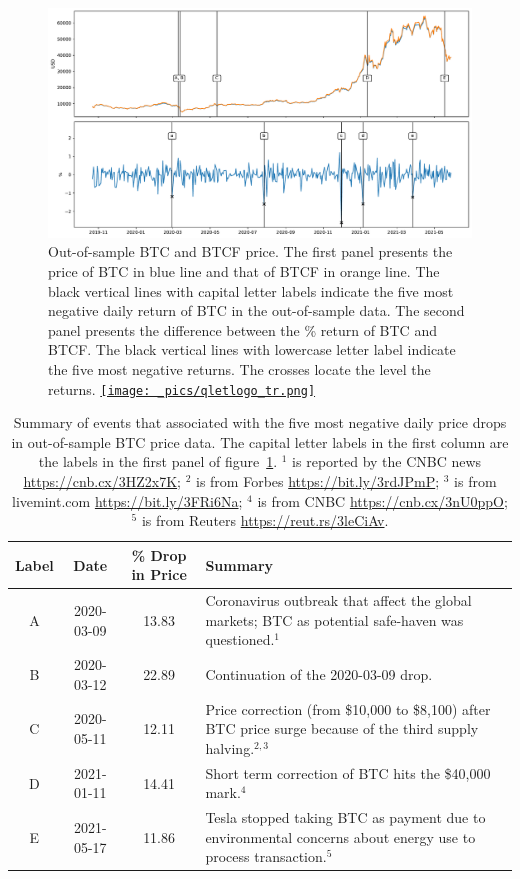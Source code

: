 \begin{figure}[!ht]
\includegraphics[width=\textwidth]{_pics/BTC_price.pdf}
  \caption{Out-of-sample BTC and BTCF price. The first panel presents the price of BTC in blue line and that of BTCF in orange line.
  The black vertical lines with capital letter labels indicate the five most negative daily return of BTC in the out-of-sample data.
  The second panel presents the difference between the \% return of BTC and BTCF.
  The black vertical lines with lowercase letter label indicate the five most negative returns.
  The crosses locate the level the returns.
  \href{http://www.quantlet.com/}{\texttt{[image: \_pics/qletlogo\_tr.png]}} }
\label{fig:BTC_price}
\end{figure}

\begin{table}[ht]
    \centering
      \begin{tabularx}{.8\textwidth}{cccX}
        \toprule
        Label &   Date & \% Drop in Price &  Summary\\
        \midrule
        A &  2020-03-09 & 13.83 &  Coronavirus outbreak that affect the global markets; BTC as potential safe-haven was questioned.$^1$\\
        B &  2020-03-12 & 22.89 &  Continuation of the 2020-03-09 drop.  \\
        C &  2020-05-11 & 12.11 &  Price correction (from \$10,000 to \$8,100) after BTC price surge because of the third supply halving.$^{2,3}$ \\
        D &  2021-01-11 & 14.41 &  Short term correction of BTC hits the \$40,000 mark.$^4$\\
        E &  2021-05-17 & 11.86 &  Tesla stopped taking BTC as payment due to environmental concerns about energy use to process transaction.$^5$\\
        \bottomrule
      \end{tabularx}
        \caption{Summary of events that associated with the five most negative daily price drops in out-of-sample BTC price data.
        The capital letter labels in the first column are the labels in the first panel of figure~\ref{fig:BTC_price}.
        $^1$ is reported by the CNBC news \url{https://cnb.cx/3HZ2x7K}; $^2$ is from Forbes \url{https://bit.ly/3rdJPmP};
        $^3$ is from livemint.com \url{https://bit.ly/3FRi6Na};
        $^4$ is from CNBC \url{https://cnb.cx/3nU0ppO};
        $^5$ is from Reuters \url{https://reut.rs/3leCiAv}.
        }
        \label{tab:BTC_5min}
  \end{table}

